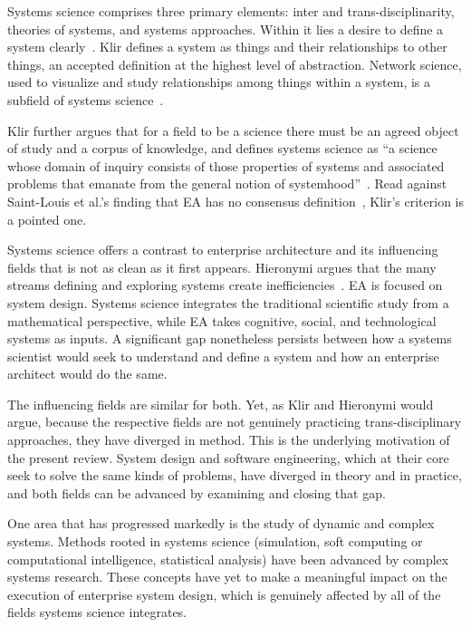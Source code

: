 \documentclass{csimq}
\begin{document}
Systems science comprises three primary elements: inter and
trans-disciplinarity, theories of systems, and systems approaches. Within it lies
a desire to define a system clearly~\cite{hieronymi2013}. Klir defines a system
as things and their relationships to other things, an accepted definition at
the highest level of abstraction. Network science, used to visualize and
study relationships among things within a system, is a subfield of systems
science~\cite{klir2001,hieronymi2013}.

Klir further argues that for a field to be a science there must be an agreed
object of study and a corpus of knowledge, and defines systems science as ``a
science whose domain of inquiry consists of those properties of systems and
associated problems that emanate from the general notion of
systemhood''~\cite{klir2001}. Read against Saint-Louis et al.'s finding that EA
has no consensus definition~\cite{saintlouis2017}, Klir's criterion is a
pointed one.

Systems science offers a contrast to enterprise architecture and its influencing
fields that is not as clean as it first appears. Hieronymi argues that the many
streams defining and exploring systems create
inefficiencies~\cite{hieronymi2013}. EA is focused on system design. Systems
science integrates the traditional scientific study from a mathematical
perspective, while EA takes cognitive, social, and technological systems as
inputs. A significant gap nonetheless persists between how a systems scientist
would seek to understand and define a system and how an enterprise architect
would do the same.

The influencing fields are similar for both. Yet, as Klir and Hieronymi would
argue, because the respective fields are not genuinely practicing
trans-disciplinary approaches, they have diverged in method. This is the
underlying motivation of the present review. System design and software
engineering, which at their core seek to solve the same kinds of problems, have
diverged in theory and in practice, and both fields can be advanced by
examining and closing that gap.

One area that has progressed markedly is the study of dynamic and complex
systems. Methods rooted in systems science (simulation, soft computing or
computational intelligence, statistical analysis) have been advanced by
complex systems research. These concepts have yet to make a meaningful impact on
the execution of enterprise system design, which is genuinely affected by all of
the fields systems science integrates.
\end{document}
